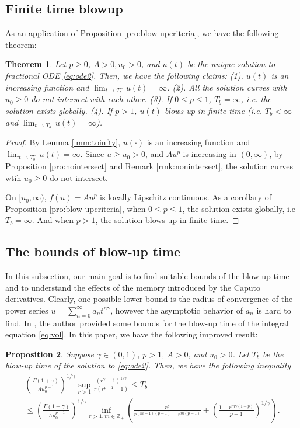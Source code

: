 \documentclass[12pt]{amsart}%
\newtheorem{thm}{Theorem}[section]
\newtheorem{pro}[thm]{Proposition}
\theoremstyle{definition}
\theoremstyle{remark}
\renewcommand{\ge}{\geqslant}
\renewcommand{\le}{\leqslant}
\begin{document}
\subsection{Finite time blowup}
As an application of Proposition \ref{pro:blow-upcriteria}, we have the following theorem:
\begin{thm}\label{thm:increasing}
Let $p\ge 0$, $A>0, u_0>0$, and $u(t)$ be the unique solution to fractional ODE \eqref{eq:ode2}. Then, we have the following claims: (1). $u(t)$ is an increasing function and $\lim_{t\to T_b^-}u(t)=\infty$. (2). All the solution curves with $u_0\ge 0$ do not intersect with each other. (3). If $0\le p\le 1$,  $T_b=\infty$, i.e. the solution exists globally.  (4). If $p>1$, $u(t)$ blows up in finite time (i.e.  $T_b<\infty$ and $\lim_{t\to T_b^-}u(t)=\infty$).
\end{thm}
\begin{proof}
By Lemma \ref{lmm:toinfty}, $u(\cdot)$ is an increasing function and $\lim_{t\to T_b^-}u(t)=\infty$. Since $u\ge u_0>0$, and $Au^p$ is increasing in $(0,\infty)$, by Proposition \ref{pro:nointersect} and Remark \ref{rmk:nonintersect}, the solution curves wtih $u_0\ge 0$ do not intersect.

On $[u_0,\infty)$, $f(u)=Au^p$ is locally Lipschitz continuous. As a corollary of Proposition \ref{pro:blow-upcriteria},  when $0\le p\le 1$, the solution exists globally, i.e $T_b=\infty$. 
And when $p>1$, the solution blows up in finite time.
\end{proof}

\subsection{The bounds of blow-up time} \label{subsec:bounds}
In this subsection, our main goal is to find suitable bounds of the blow-up time and to understand the effects of the memory introduced by the Caputo derivatives. Clearly, one possible lower bound is the radius of convergence of the power series $u=\sum_{n=0}^{\infty}a_n t^{n\gamma}$, however the asymptotic behavior of $a_n$ is hard to find. In \cite{roberts1993volterra}, the author provided some bounds for the blow-up time of the integral equation \eqref{eq:vol}. In this paper, we have the following improved result:


\begin{pro}\label{pro:bound}
Suppose $\gamma\in (0,1)$, $p>1$, $A>0$, and $u_0>0$. Let $T_b$ be the blow-up time of the solution to \eqref{eq:ode2}. Then, we have the following inequality
\begin{multline} 
\left(\frac{\Gamma(1+\gamma)}{Au_0^{p-1}}\right)^{1/\gamma}
\sup_{r>1}\frac{(r^{\gamma}-1)^{1/\gamma}}{r(r^{p-1}-1)} \le T_b \\
\le 
\left(\frac{\Gamma(1+\gamma)}{Au_0^{p-1}}\right)^{1/\gamma}\inf_{r>1, m\in\mathbb{Z}_+}\left(\frac{r^p}{r^{(m+1)(p-1)}-r^{m(p-1)}}+\left(\frac{1-r^{m\gamma(1-p)}}{p-1}\right)^{1/\gamma}\right).
\end{multline}
\end{pro}
\end{document}

